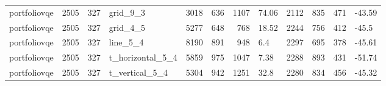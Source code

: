 \begin{longtable}{lrrlrrrlrrrl}
portfoliovqe & 2505 & 327 & grid\_9\_3 & 3018 & 636 & 1107 & 74.06 & 2112 & 835 & 471 & -43.59 \\
portfoliovqe & 2505 & 327 & grid\_4\_5 & 5277 & 648 & 768 & 18.52 & 2244 & 756 & 412 & -45.5 \\
portfoliovqe & 2505 & 327 & line\_5\_4 & 8190 & 891 & 948 & 6.4 & 2297 & 695 & 378 & -45.61 \\
portfoliovqe & 2505 & 327 & t\_horizontal\_5\_4 & 5859 & 975 & 1047 & 7.38 & 2288 & 893 & 431 & -51.74 \\
portfoliovqe & 2505 & 327 & t\_vertical\_5\_4 & 5304 & 942 & 1251 & 32.8 & 2280 & 834 & 456 & -45.32 \\
\end{longtable}
